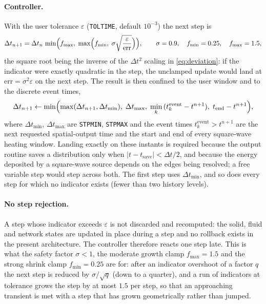 \documentclass[11pt,a4paper]{article}
\newcommand{\code}[1]{\texttt{#1}}
\begin{document}
\paragraph{Controller.}
With the user tolerance $\varepsilon$ (\code{TOLTIME}, default $10^{-3}$) the
next step is
\begin{equation}
  \Delta t_{n+1} = \Delta t_{n}\,
  \min\Bigl(f_{\max},\;\max\Bigl(f_{\min},\;
  \sigma\sqrt{\frac{\varepsilon}{\mathrm{err}}}\Bigr)\Bigr),
  \qquad
  \sigma = 0.9,\quad f_{\min} = 0.25,\quad f_{\max} = 1.5,
  \label{eq:controller}
\end{equation}
the square root being the inverse of the $\Delta t^{2}$ scaling in
\eqref{eq:deviation}: if the indicator were exactly quadratic in the step, the
unclamped update would land at $\mathrm{err} = \sigma^{2}\varepsilon$ on the
next step. The result is then confined to the user window and to the discrete
event times,
\begin{equation}
  \Delta t_{n+1} \leftarrow
  \min\Bigl(\max(\Delta t_{n+1}, \Delta t_{\min}),\;\Delta t_{\max},\;
  \min_{k}\,(t_{k}^{\mathrm{event}} - t^{n+1}),\; t_{\mathrm{end}} - t^{n+1}\Bigr),
  \label{eq:clamps}
\end{equation}
where $\Delta t_{\min}$, $\Delta t_{\max}$ are \code{STPMIN}, \code{STPMAX} and the
event times $t_{k}^{\mathrm{event}} > t^{n+1}$ are the next requested
spatial-output time and the start and end of every square-wave heating window.
Landing exactly on these instants is required because the output routine saves a
distribution only when $|t - t_{\mathrm{save}}| < \Delta t/2$, and because the
energy deposited by a square-wave source depends on the edges being resolved;
a free variable step would step across both. The first step uses
$\Delta t_{\min}$, and so does every step for which no indicator exists (fewer
than two history levels).

\paragraph{No step rejection.}
A step whose indicator exceeds $\varepsilon$ is not discarded and recomputed:
the solid, fluid and network states are updated in place during a step and no
rollback exists in the present architecture. The controller therefore reacts one
step late. This is what the safety factor $\sigma < 1$, the moderate growth
clamp $f_{\max} = 1.5$ and the strong shrink clamp $f_{\min} = 0.25$ are for:
after an indicator overshoot of a factor $q$ the next step is reduced by
$\sigma/\sqrt{q}$ (down to a quarter), and a run of indicators at tolerance
grows the step by at most $1.5$ per step, so that an approaching transient is
met with a step that has grown geometrically rather than jumped.
\end{document}
